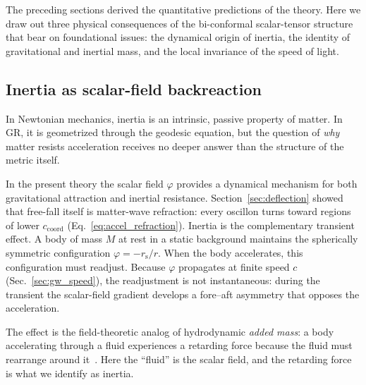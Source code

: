 \documentclass[aps,prd,onecolumn,superscriptaddress,nofootinbib,showpacs,12pt]{revtex4-2}
\newcommand{\rs}{r_{\mathrm{s}}}
\begin{document}
The preceding sections derived the quantitative predictions
of the theory.  Here we draw out three physical consequences
of the bi-conformal scalar-tensor structure that bear on
foundational issues: the dynamical origin of inertia, the
identity of gravitational and inertial mass, and the local
invariance of the speed of light.

\subsection{Inertia as scalar-field backreaction}
\label{sec:inertia}

In Newtonian mechanics, inertia is an intrinsic, passive
property of matter.  In GR, it is geometrized through the
geodesic equation, but the question of \emph{why} matter
resists acceleration receives no deeper answer than the
structure of the metric itself.

In the present theory the scalar field $\varphi$ provides
a dynamical mechanism for both gravitational attraction
and inertial resistance.  Section~\ref{sec:deflection}
showed that free-fall itself is matter-wave refraction:
every oscillon turns toward regions of lower
$c_{\mathrm{coord}}$
(Eq.~\ref{eq:accel_refraction}).  Inertia is the
complementary transient effect.  A body of mass $M$ at
rest in a static background maintains the spherically
symmetric configuration $\varphi = -\rs/r$.  When the body
accelerates, this configuration must readjust.  Because
$\varphi$ propagates at finite speed $c$
(Sec.~\ref{sec:gw_speed}), the readjustment is not
instantaneous: during the transient the scalar-field
gradient develops a fore--aft asymmetry that opposes
the acceleration.

The effect is the field-theoretic analog of hydrodynamic
\emph{added mass}: a body accelerating through a fluid
experiences a retarding force because the fluid must
rearrange around it~\cite{LambHydro}.  Here the ``fluid''
is the scalar field, and the retarding force is what we
identify as inertia.
\end{document}
